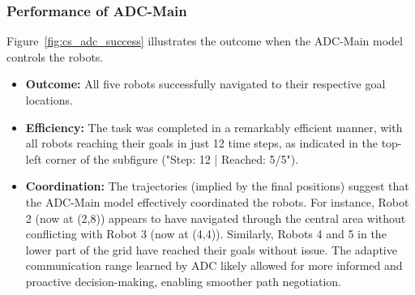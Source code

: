 \subsubsection{Performance of ADC-Main}
\label{subsubsec:adc_performance}
Figure~\ref{fig:cs_adc_success} illustrates the outcome when the ADC-Main model controls the robots.
\begin{itemize}
    \item \textbf{Outcome:} All five robots successfully navigated to their respective goal locations.
    \item \textbf{Efficiency:} The task was completed in a remarkably efficient manner, with all robots reaching their goals in just 12 time steps, as indicated in the top-left corner of the subfigure ("Step: 12 | Reached: 5/5").
    \item \textbf{Coordination:} The trajectories (implied by the final positions) suggest that the ADC-Main model effectively coordinated the robots. For instance, Robot 2 (now at (2,8)) appears to have navigated through the central area without conflicting with Robot 3 (now at (4,4)). Similarly, Robots 4 and 5 in the lower part of the grid have reached their goals without issue. The adaptive communication range learned by ADC likely allowed for more informed and proactive decision-making, enabling smoother path negotiation.
\end{itemize}

